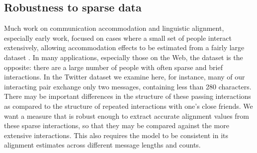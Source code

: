 \documentclass{acm_proc_article-sp}
\begin{document}
\subsection{Robustness to sparse data} 

Much work on communication accommodation and linguistic alignment, especially early work, focused on cases where a small set of people interact extensively, allowing accommodation effects to be estimated from a fairly large dataset \cite{Ferrara1991,GonzalesHancockPennebaker2010,IrelandEtAl2011}.  In many applications, especially those on the Web, the dataset is the opposite: there are a large number of people with often sparse and brief interactions.  In the Twitter dataset we examine here, for instance, many of our interacting pair exchange only two messages, containing less than 280 characters.  There may be important differences in the structure of these passing interactions as compared to the structure of repeated interactions with one's close friends.  We want a measure that is robust enough to extract accurate alignment values from these sparse interactions, so that they may be compared against the more extensive interactions.  This also requires the model to be consistent in its alignment estimates across different message lengths and counts. %



 
\end{document}
